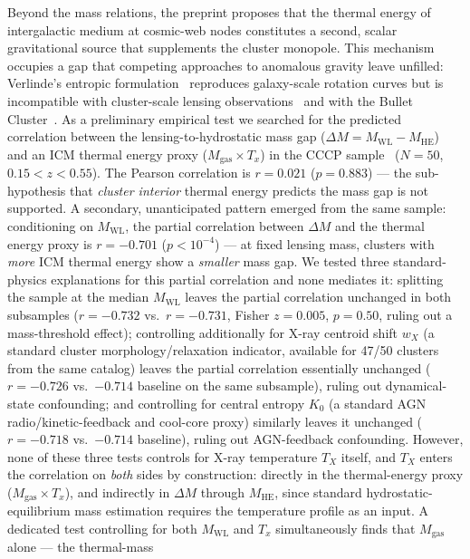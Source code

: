 \documentclass[twocolumn,prd,amsmath,amssymb,floatfix]{revtex4-2}
\begin{document}
Beyond the mass relations, the preprint proposes that the thermal energy of
intergalactic medium at cosmic-web nodes constitutes a second, scalar gravitational
source that supplements the cluster monopole.
This mechanism occupies a gap that competing approaches to anomalous gravity
leave unfilled: Verlinde's entropic formulation~\cite{verlinde2016} reproduces
galaxy-scale rotation curves but is incompatible with cluster-scale lensing
observations~\cite{hossenfelder2017,ettori2016} and with the Bullet
Cluster~\cite{clowe2006}.
As a preliminary empirical test we searched for the predicted correlation between
the lensing-to-hydrostatic mass gap ($\Delta M = M_\mathrm{WL} - M_\mathrm{HE}$)
and an ICM thermal energy proxy ($M_\mathrm{gas}\times T_x$) in the CCCP
sample~\cite{mahdavi2013} ($N=50$, $0.15<z<0.55$).
The Pearson correlation is $r=0.021$ ($p=0.883$) --- the sub-hypothesis that
\emph{cluster interior} thermal energy predicts the mass gap is not supported.
A secondary, unanticipated pattern emerged from the same sample: conditioning on
$M_\mathrm{WL}$, the partial correlation between $\Delta M$ and the thermal
energy proxy is $r=-0.701$ ($p<10^{-4}$) --- at fixed lensing mass, clusters with
\emph{more} ICM thermal energy show a \emph{smaller} mass gap. We tested three
standard-physics explanations for this partial correlation and none mediates it:
splitting the sample at the median $M_\mathrm{WL}$ leaves the
partial correlation unchanged in both subsamples ($r=-0.732$ vs.\ $r=-0.731$,
Fisher $z=0.005$, $p=0.50$, ruling out a mass-threshold effect); controlling
additionally for X-ray centroid shift $w_X$ (a standard cluster
morphology/relaxation indicator, available for 47/50 clusters from the same
catalog) leaves the partial correlation essentially unchanged
($r=-0.726$ vs.\ $-0.714$ baseline on the same subsample), ruling out
dynamical-state confounding; and controlling for central entropy $K_0$ (a
standard AGN radio/kinetic-feedback and cool-core proxy) similarly leaves it
unchanged ($r=-0.718$ vs.\ $-0.714$ baseline), ruling out AGN-feedback
confounding. However, none of these three tests controls for X-ray temperature
$T_X$ itself, and $T_X$ enters the correlation on \emph{both} sides by
construction: directly in the thermal-energy proxy ($M_\mathrm{gas}\times T_x$),
and indirectly in $\Delta M$ through $M_\mathrm{HE}$, since standard
hydrostatic-equilibrium mass estimation requires the temperature profile as an
input. A dedicated test controlling for both $M_\mathrm{WL}$ and $T_x$
simultaneously finds that $M_\mathrm{gas}$ alone --- the thermal-mass
\end{document}
